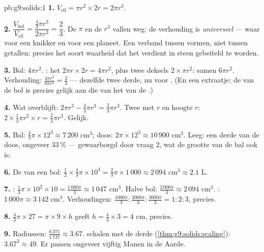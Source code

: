 \begin{solution}{pb:g9:solids:1}
\textbf{1.} $V_{\text{cil}} = \pi r^2 \times 2r = 2\pi r^3$.

\textbf{2.} $\dfrac{V_{\text{bol}}}{V_{\text{cil}}}
= \dfrac{\frac43 \pi r^3}{2 \pi r^3} = \dfrac23$. De $\pi$ en de $r^3$ vallen weg:
de verhouding is \emph{universeel} --- waar voor een knikker en voor een planeet.
Een verband tussen vormen, niet tussen getallen: precies het soort waarheid dat het
verdient in steen gebeiteld te worden.

\textbf{3.} Bol: $4\pi r^2$. : het 
$2\pi r \times 2r = 4\pi r^2$, plus twee deksels $2 \times \pi r^2$: samen
$6\pi r^2$. Verhouding: $\frac{4\pi r^2}{6\pi r^2} = \frac23$ --- dezelfde twee
derde, nu voor . (En een extraatje: de  van de bol is precies
gelijk aan die van het  van de .)

\textbf{4.} Wat overblijft: $2\pi r^3 - \frac43\pi r^3 = \frac23 \pi r^3$. Twee
 met  $r$ en hoogte $r$: $2 \times \frac13 \pi r^2 \times r
= \frac23 \pi r^3$. Gelijk.

\textbf{5.} Bal: $\frac43 \pi \times 12^3 \approx 7\,200$ cm$^3$; doos:
$2\pi \times 12^3 \approx 10\,900$ cm$^3$. Leeg: een derde van de doos, ongeveer
$33\,\%$ --- gewaarborgd door vraag 2, wat de grootte van de bal ook is.

\textbf{6.} De  van een bol:
$\frac12 \times \frac43 \pi \times 10^3 = \frac23 \pi \times 1\,000 \approx
2\,094$ cm$^3 \approx 2.1$ L.

\textbf{7.} : $\frac13 \pi \times 10^2 \times 10 = \frac{1\,000\pi}{3}
\approx 1\,047$ cm$^3$. Halve bol: $\frac{2\,000\pi}{3} \approx 2\,094$ cm$^3$.
: $1\,000\pi \approx 3\,142$ cm$^3$. Verhoudingen:
$\frac{1000\pi}{3} : \frac{2000\pi}{3} : \frac{3000\pi}{3} = 1 : 2 : 3$, precies.

\textbf{8.} $\frac43 \pi \times 27 = \pi \times 9 \times h$ geeft
$h = \frac43 \times 3 = 4$ cm, precies.

\textbf{9.} Radiussen: $\frac{6\,371}{1\,737} \approx 3.67$.  schalen met
de derde  (\cref{thm:g9:solids:scaling}): $3.67^3 \approx 49$. Er passen
ongeveer vijftig Manen in de Aarde.


\end{solution}
